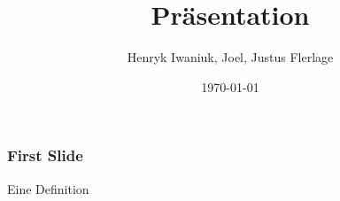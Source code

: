 \documentclass{beamer}
\title{Präsentation}
\author{Henryk Iwaniuk, Joel, Justus Flerlage}
\date{\today}
\begin{document}
\maketitle
\frame{\tableofcontents[currentsection]}

\begin{frame}
  \frametitle{First Slide}
  \begin{Definition}
    Eine Definition
  \end{Definition}
\end{frame}
\end{document}
